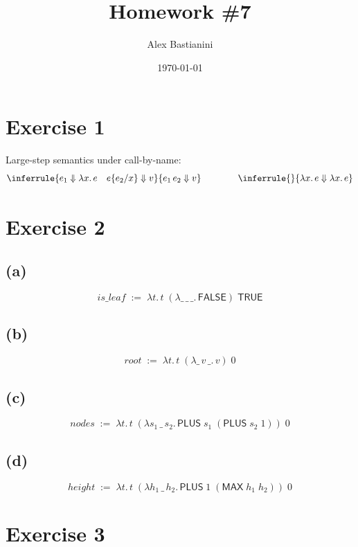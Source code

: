 \documentclass[11pt]{article}
\title{Homework \#7}
\author{Alex Bastianini}
\date{\today}
\newcommand{\lam}[2]{\lambda #1.\,#2}
\newcommand{\TRUE}{\mathsf{TRUE}}
\newcommand{\FALSE}{\mathsf{FALSE}}
\newcommand{\PLUS}{\mathsf{PLUS}}
\newcommand{\MAX}{\mathsf{MAX}}
\newcommand{\sub}[2]{\{#1/#2\}}
\begin{document}
\maketitle

\section*{Exercise 1}

Large-step semantics under call-by-name:
\[
\inferrule{e_1 \Downarrow \lam{x}{e}\quad e\sub{e_2}{x} \Downarrow v}{e_1\, e_2 \Downarrow v}
\qquad\qquad
\inferrule{ }{\lam{x}{e} \Downarrow \lam{x}{e}}
\]

\section*{Exercise 2}
\subsection*{(a)}
\[
\mathit{is\_leaf} \;:=\; \lam{t}{t\;(\lam{\_\,\_\,\_}{\FALSE})\;\TRUE}
\]

\subsection*{(b)}
\[
\mathit{root} \;:=\; \lam{t}{t\;(\lam{\_\,v\,\_}{v})\;0}
\]

\subsection*{(c)}
\[
\mathit{nodes} \;:=\; \lam{t}{t\;(\lam{s_1\,\_\,s_2}{\PLUS\; s_1\; (\PLUS\; s_2\; 1)})\;0}
\]

\subsection*{(d)}
\[
\mathit{height} \;:=\; \lam{t}{t\;(\lam{h_1\,\_\,h_2}{\PLUS\; 1\; (\MAX\; h_1\; h_2)})\;0}
\]

\section*{Exercise 3}
\end{document}
